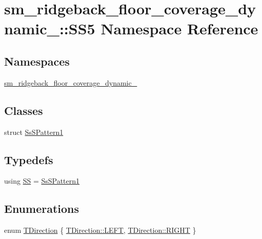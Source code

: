 \hypertarget{namespacesm__ridgeback__floor__coverage__dynamic__1_1_1SS5}{}\section{sm\+\_\+ridgeback\+\_\+floor\+\_\+coverage\+\_\+dynamic\+\_\+:\+:S\+S5 Namespace Reference}
\label{namespacesm__ridgeback__floor__coverage__dynamic__1_1_1SS5}
\subsection*{Namespaces}
\begin{DoxyCompactItemize}
\item 
 \hyperlink{namespacesm__ridgeback__floor__coverage__dynamic__1_1_1SS5_1_1sm__ridgeback__floor__coverage__dynamic__1}{sm\+\_\+ridgeback\+\_\+floor\+\_\+coverage\+\_\+dynamic\+\_}
\end{DoxyCompactItemize}
\subsection*{Classes}
\begin{DoxyCompactItemize}
\item 
struct \hyperlink{structsm__ridgeback__floor__coverage__dynamic__1_1_1SS5_1_1SsSPattern1}{Ss\+S\+Pattern1}
\end{DoxyCompactItemize}
\subsection*{Typedefs}
\begin{DoxyCompactItemize}
\item 
using \hyperlink{namespacesm__ridgeback__floor__coverage__dynamic__1_1_1SS5_aa37fc0a5a5c9436a8a7bec7feb9d3cce}{SS} = \hyperlink{structsm__ridgeback__floor__coverage__dynamic__1_1_1SS5_1_1SsSPattern1}{Ss\+S\+Pattern1}
\end{DoxyCompactItemize}
\subsection*{Enumerations}
\begin{DoxyCompactItemize}
\item 
enum \hyperlink{namespacesm__ridgeback__floor__coverage__dynamic__1_1_1SS5_ac4b517bcfa16bb73b577c12b354754e5}{T\+Direction} \{ \hyperlink{namespacesm__ridgeback__floor__coverage__dynamic__1_1_1SS5_ac4b517bcfa16bb73b577c12b354754e5a684d325a7303f52e64011467ff5c5758}{T\+Direction\+::\+L\+E\+FT}, 
\hyperlink{namespacesm__ridgeback__floor__coverage__dynamic__1_1_1SS5_ac4b517bcfa16bb73b577c12b354754e5a21507b40c80068eda19865706fdc2403}{T\+Direction\+::\+R\+I\+G\+HT}
 \}
\end{DoxyCompactItemize}


